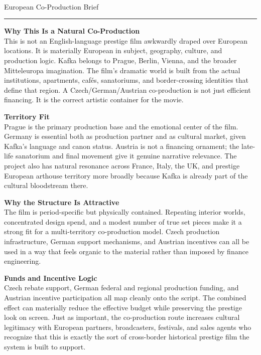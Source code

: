 \documentclass[11pt,letterpaper]{article}
\begin{document}
\begin{center}
{\Large\bfseries\sffamily \filmtitleupper}\\[3pt]
{\normalsize\sffamily\color{kafkagray} European Co-Production Brief}
\end{center}
\vspace{2pt}
\textcolor{sectionrule}{\rule{\textwidth}{0.5pt}}
\vspace{4pt}

\textbf{Why This Is a Natural Co-Production}\\
This is not an English-language prestige film awkwardly draped over European locations. It is materially European in subject, geography, culture, and production logic. Kafka belongs to Prague, Berlin, Vienna, and the broader Mitteleuropa imagination. The film's dramatic world is built from the actual institutions, apartments, cafés, sanatoriums, and border-crossing identities that define that region. A Czech/German/Austrian co-production is not just efficient financing. It is the correct artistic container for the movie.

\vspace{2pt}

\textbf{Territory Fit}\\
Prague is the primary production base and the emotional center of the film. Germany is essential both as production partner and as cultural market, given Kafka's language and canon status. Austria is not a financing ornament; the late-life sanatorium and final movement give it genuine narrative relevance. The project also has natural resonance across France, Italy, the UK, and prestige European arthouse territory more broadly because Kafka is already part of the cultural bloodstream there.

\vspace{2pt}

\textbf{Why the Structure Is Attractive}\\
The film is period-specific but physically contained. Repeating interior worlds, concentrated design spend, and a modest number of true set pieces make it a strong fit for a multi-territory co-production model. Czech production infrastructure, German support mechanisms, and Austrian incentives can all be used in a way that feels organic to the material rather than imposed by finance engineering.

\vspace{2pt}

\textbf{Funds and Incentive Logic}\\
Czech rebate support, German federal and regional production funding, and Austrian incentive participation all map cleanly onto the script. The combined effect can materially reduce the effective budget while preserving the prestige look on screen. Just as important, the co-production route increases cultural legitimacy with European partners, broadcasters, festivals, and sales agents who recognize that this is exactly the sort of cross-border historical prestige film the system is built to support.
\end{document}
